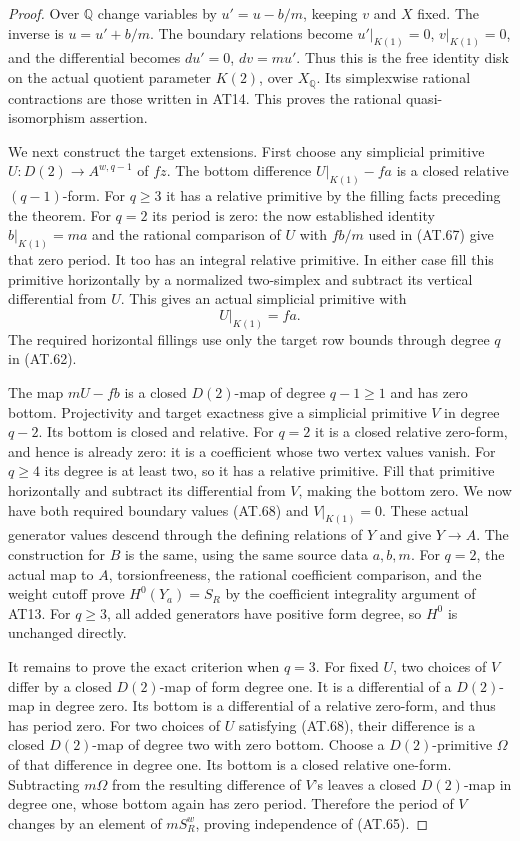 \begin{proof}
Over $\mathbb Q$ change variables by $u'=u-b/m$,
keeping $v$ and $X$ fixed. The inverse is $u=u'+b/m$.
The boundary relations become $u'|_{K(1)}=0$,
$v|_{K(1)}=0$, and the differential becomes
$du'=0$, $dv=mu'$.
Thus this is the free identity disk on the actual
quotient parameter $K(2)$, over $X_{\mathbb Q}$.
Its simplexwise rational contractions are those
written in AT14. This proves the rational
quasi-isomorphism assertion.

We next construct the target extensions.
First choose any simplicial primitive
$U:D(2)\to A^{w,q-1}$ of $fz$.
The bottom difference $U|_{K(1)}-fa$ is a closed
relative $(q-1)$-form.
For $q\geq3$ it has a relative primitive by the
filling facts preceding the theorem.
For $q=2$ its period is zero: the now established
identity $b|_{K(1)}=ma$ and the rational comparison
of $U$ with $fb/m$ used in \textup{(AT.67)} give
that zero period. It too has an integral relative
primitive.
In either case fill this primitive horizontally
by a normalized two-simplex and subtract its vertical
differential from $U$.
This gives an actual simplicial primitive with
\[
                              U|_{K(1)}=fa.
 \tag{AT.68}
\]
The required horizontal fillings use only the
target row bounds through degree $q$ in
\textup{(AT.62)}.

The map $mU-fb$ is a closed $D(2)$-map of degree
$q-1\geq1$ and has zero bottom.
Projectivity and target exactness give a simplicial
primitive $V$ in degree $q-2$.
Its bottom is closed and relative.
For $q=2$ it is a closed relative zero-form, and
hence is already zero: it is a coefficient whose
two vertex values vanish.
For $q\geq4$ its degree is at least two, so it
has a relative primitive.
Fill that primitive horizontally and subtract
its differential from $V$, making the bottom zero.
We now have both required boundary values
\textup{(AT.68)} and $V|_{K(1)}=0$.
These actual generator values descend through
the defining relations of $Y$ and give $Y\to A$.
The construction for $B$ is the same, using the
same source data $a,b,m$.
For $q=2$, the actual map to $A$, torsionfreeness,
the rational coefficient comparison, and the weight
cutoff prove $H^0(Y_a)=S_R$ by the coefficient
integrality argument of AT13.
For $q\geq3$, all added generators have positive
form degree, so $H^0$ is unchanged directly.

It remains to prove the exact criterion when $q=3$.
For fixed $U$, two choices of $V$ differ by a closed
$D(2)$-map of form degree one.
It is a differential of a $D(2)$-map in degree zero.
Its bottom is a differential of a relative zero-form,
and thus has period zero.
For two choices of $U$ satisfying \textup{(AT.68)},
their difference is a closed $D(2)$-map of degree
two with zero bottom.
Choose a $D(2)$-primitive $\Omega$ of that difference
in degree one.
Its bottom is a closed relative one-form.
Subtracting $m\Omega$ from the resulting difference
of $V$'s leaves a closed $D(2)$-map in degree one,
whose bottom again has zero period.
Therefore the period of $V$ changes by an element
of $mS_R^w$, proving independence of
\textup{(AT.65)}.


\end{proof}
